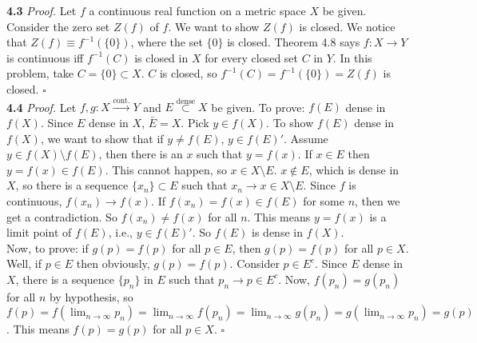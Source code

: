 \documentclass[11pt]{article}
\begin{document}
\noindent \textbf{4.3} 
\noindent \textit{Proof.} Let $f$ a continuous real function on a metric space $X$ be given. Consider the zero set $Z(f)$ of $f$. We want to show $Z(f)$ is closed. We notice that $Z(f) \equiv f^{-1}(\{ 0 \})$, where the set $\{ 0\}$ is closed. Theorem 4.8 says $f: X\to Y$ is continuous iff $f^{-1}(C)$ is closed in $X$ for every closed set $C$ in $Y$. In this problem, take $C = \{ 0 \} \subset X$. $C$ is closed, so $f^{-1}(C) = f^{-1}(\{ 0\}) = Z(f)$ is closed. \hfill $\square$ \\




\noindent \textbf{4.4}  
\noindent \textit{Proof.} Let $f,g : X \xrightarrow{\text{cont.}} Y$ and $E \stackrel{\text{dense}}{\subset} X$ be given. To prove: $f(E)$ dense in $f(X)$. Since $E$ dense in $X$, $\bar{E} = X$. Pick $y \in f(X)$. To show $f(E)$ dense in $f(X)$, we want to show that if $y \neq f(E)$, $y \in f(E)'$. Assume $y \in f(X) \setminus f(E)$, then there is an $x$ such that $y = f(x)$. If $x \in E$ then $y = f(x)\in f(E)$. This cannot happen, so $x \in X\setminus E$. $x \notin E$, which is dense in $X$, so there is a sequence $\{ x_n\} \subset E$ such that $x_n \to x \in X\setminus E$. Since $f$ is continuous, $f(x_n) \to f(x)$. If $f(x_n) = f(x) \in f(E)$ for some $n$, then we get a contradiction. So $f(x_n) \neq f(x)$ for all $n$. This means $y = f(x)$ is a limit point of $f(E)$, i.e., $y \in f(E)'$. So $f(E)$ is dense in $f(X)$.\\

Now, to prove: if $g(p) = f(p)$ for all $p \in E$, then $g(p) = f(p)$ for all $p \in X$. Well, if $p \in E$ then obviously, $g(p) = f(p)$. Consider $p \in E^c$. Since $E$ dense in $X$, there is a sequence $\{ p_n\}$ in $E$ such that $p_n \to p \in E^c$. Now, $f(p_n) = g(p_n)$ for all $n$ by hypothesis, so $f(p) = f(\lim_{n\to \infty} p_n) = \lim_{n\to \infty}f(p_n) =\lim_{n\to \infty}g(p_n) = g(\lim_{n\to \infty} p_n) = g(p)$. This means $f(p) = g(p)$ for all $p \in X$. \hfill $\square$\\ 
\end{document}
